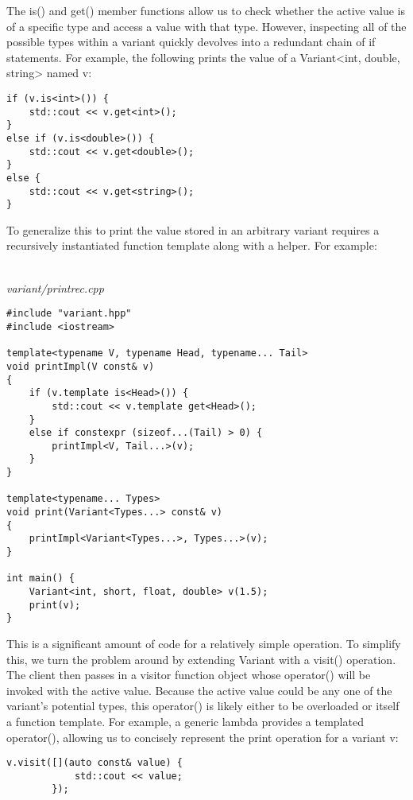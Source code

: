 
The is() and get() member functions allow us to check whether the active value is of a specific type and access a value with that type. However, inspecting all of the possible types within a variant quickly devolves into a redundant chain of if statements. For example, the following prints the value of a Variant<int, double, string> named v:

\begin{lstlisting}[style=styleCXX]
if (v.is<int>()) {
	std::cout << v.get<int>();
}
else if (v.is<double>()) {
	std::cout << v.get<double>();
}
else {
	std::cout << v.get<string>();
}
\end{lstlisting}

To generalize this to print the value stored in an arbitrary variant requires a recursively instantiated function template along with a helper. For example:

\hspace*{\fill} \\ %
\noindent
\textit{variant/printrec.cpp}
\begin{lstlisting}[style=styleCXX]
#include "variant.hpp"
#include <iostream>

template<typename V, typename Head, typename... Tail>
void printImpl(V const& v)
{
	if (v.template is<Head>()) {
		std::cout << v.template get<Head>();
	}
	else if constexpr (sizeof...(Tail) > 0) {
		printImpl<V, Tail...>(v);
	}
}

template<typename... Types>
void print(Variant<Types...> const& v)
{
	printImpl<Variant<Types...>, Types...>(v);
}

int main() {
	Variant<int, short, float, double> v(1.5);
	print(v);
}
\end{lstlisting}

This is a significant amount of code for a relatively simple operation. To simplify this, we turn the problem around by extending Variant with a visit() operation. The client then passes in a visitor function object whose operator() will be invoked with the active value. Because the active value could be any one of the variant’s potential types, this operator() is likely either to be overloaded or itself a function template. For example, a generic lambda provides a templated operator(), allowing us to concisely represent the print operation for a variant v:

\begin{lstlisting}[style=styleCXX]
v.visit([](auto const& value) {
			std::cout << value;
		});
\end{lstlisting}

